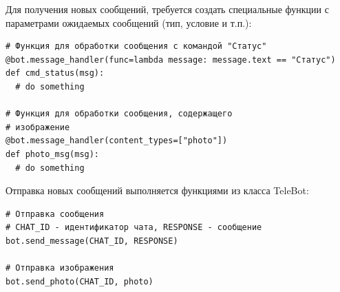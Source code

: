 Для получения новых сообщений, требуется создать специальные функции
с параметрами ожидаемых сообщений (тип, условие и т.п.):

\begin{lstlisting}
# Функция для обработки сообщения с командой "Статус" 
@bot.message_handler(func=lambda message: message.text == "Статус")
def cmd_status(msg):
  # do something

# Функция для обработки сообщения, содержащего
# изображение
@bot.message_handler(content_types=["photo"])
def photo_msg(msg):
  # do something
\end{lstlisting}

Отправка новых сообщений выполняется функциями из класса TeleBot:

\begin{lstlisting}
# Отправка сообщения
# CHAT_ID - идентификатор чата, RESPONSE - сообщение
bot.send_message(CHAT_ID, RESPONSE)

# Отправка изображения
bot.send_photo(CHAT_ID, photo)
\end{lstlisting}
